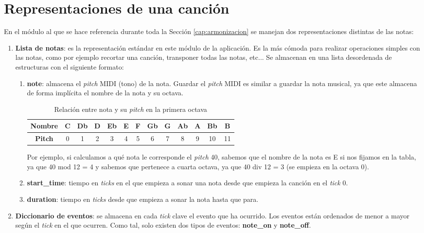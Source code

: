 \chapter{Representaciones de una canción}
\label{Appendix:Key2}

    En el módulo al que se hace referencia durante toda la Sección \ref{cap:armonizacion} se manejan dos representaciones distintas de las notas:

    \begin{enumerate}
        \item \textbf{Lista de notas}: es la representación estándar en este módulo de la aplicación. Es la más cómoda para realizar operaciones simples con las notas, como por ejemplo recortar una canción, transponer todas las notas, etc... Se almacenan en una lista desordenada de estructuras con el siguiente formato:
        \begin{enumerate}
            \item[\textbullet] \textbf{note}: almacena el \textit{pitch} MIDI (tono) de la nota. Guardar el \textit{pitch} MIDI es similar a guardar la nota musical, ya que este almacena de forma implícita el nombre de la nota y su octava.
                       
\begin{table}[htbp]
    \centering
    \begin{tabular}{c||c|c|c|c|c|c|c|c|c|c|c|c}
        \textbf{Nombre} & C & Db & D & Eb & E & F & Gb & G & Ab & A & Bb & B \\ 
        \hline
        \textbf{Pitch} &  0 & 1 & 2 & 3 & 4 & 5 & 6 & 7 & 8 & 9 & 10 & 11 \\
    \end{tabular}
    \caption{Relación entre nota y su \textit{pitch} en la primera octava}
\label{tab:nota_pitch}
\end{table}

         Por ejemplo, si calculamos a qué nota le corresponde el \textit{pitch} 40, sabemos que el nombre de la nota es E si nos fijamos en la tabla, ya que 40 mod 12 = 4 y sabemos que pertenece a cuarta octava, ya que 40 div 12 = 3 (se empieza en la octava 0).

        \item[\textbullet] \textbf{start\_time}: tiempo en \textit{ticks} en el que empieza a sonar una nota desde que empieza la canción en el \textit{tick} 0.
        \item[\textbullet] \textbf{duration}: tiempo en \textit{ticks} desde que empieza a sonar la nota hasta que para.
    \end{enumerate}
    \item \textbf{Diccionario de eventos}: se almacena en cada \textit{tick} clave el evento que ha ocurrido. Los eventos están ordenados de menor a mayor según el \textit{tick} en el que ocurren. Como tal, solo existen dos tipos de eventos: \textbf{note\_on} y \textbf{note\_off}.


\end{enumerate}
